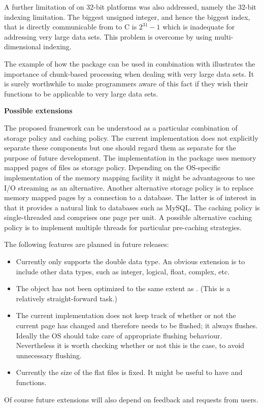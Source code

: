 \documentclass[12pt,a4paper]{article}
\begin{document}
A further limitation of \R{} on 32-bit platforms was also addressed, namely the 32-bit indexing limitation. 
The biggest unsigned integer, and hence the biggest index, that is directly communicable from \R{} to C is $2^{31} - 1$ which is inadequate for addressing very large data sets. 
This problem is overcome by using multi-dimensional indexing. 

The example of how the  package can be used in combination with  illustrates the importance of chunk-based processing when dealing with very large data sets.
It is surely worthwhile to make \R{} programmers aware of this fact if they wish their functions to be applicable to very large data sets. 

\textbf{Possible extensions}

The proposed framework can be understood as a particular combination of storage policy and caching policy. 
The current implementation does not explicitly separate these components but one should regard them as separate for the purpose of future development.
The implementation in the  package uses memory mapped pages of files as storage policy. 
Depending on the OS-specific implementation of the memory mapping facility it might be advantageous to use I/O streaming as an alternative. 
Another alternative storage policy is to replace memory mapped pages by a connection to a database.
The latter is of interest in that it provides a natural link to databases such as MySQL.
The caching policy is single-threaded and comprises one page per unit. 
A possible alternative caching policy is to implement multiple threads for particular pre-caching strategies. 

The following features are planned in future releases: 

\begin{itemize}
  \item Currently  only supports the double data type. 
An obvious extension is to include other data types, such as integer, logical, float, complex, etc.  

  \item The object  has not been optimized to the same extent as . (This is a relatively straight-forward task.)

  \item The current implementation does not keep track of whether or not the current page has changed and therefore needs to be flushed; it always flushes. 
Ideally the OS should take care of appropriate flushing behaviour. 
Nevertheless it is worth checking whether or not this is the case, to avoid unnecessary flushing. 

  \item Currently the size of the flat files is fixed. It might be useful to have  and  functions. 

\end{itemize}

Of course future extensions will also depend on feedback and requests from users.





\end{document}
